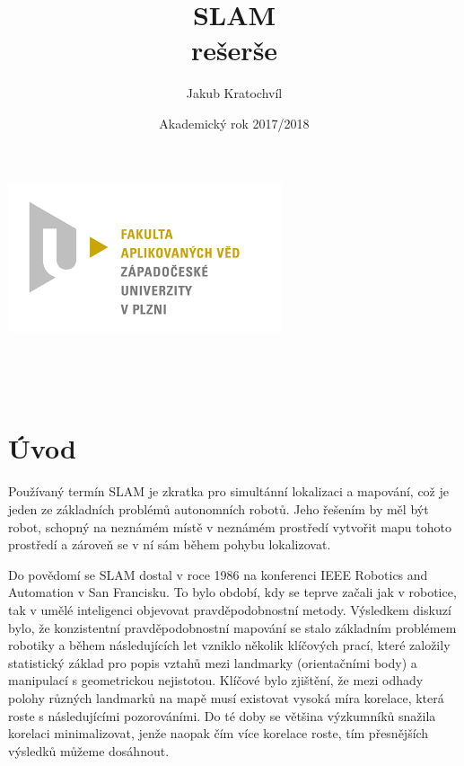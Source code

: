 \documentclass[12pt,a4paper]{article}
\begin{document}
\title{SLAM\\rešerše}
\author{Jakub Kratochvíl}
\date{Akademický rok 2017/2018}
\begin{titlepage}
\begin{center}
\includegraphics[scale=0.5]{logo_zcu}\\
\vspace{5cm}
\begin{Large}
\textbf{\thetitle}\\
\end{Large}
\vspace{3cm}
\theauthor\\
\vspace{5cm}
\thedate
\end{center}
\end{titlepage}
\newpage
		
		
\tableofcontents
\newpage
\fontsize{12pt}{18pt}\selectfont


\section{Úvod}
Používaný termín SLAM je zkratka pro simultánní lokalizaci a mapování, což je jeden ze základních problémů autonomních robotů. Jeho řešením by měl být robot, schopný na neznámém místě v neznámém prostředí vytvořit mapu tohoto prostředí a zároveň se v ní sám během pohybu lokalizovat.

Do povědomí se SLAM dostal v roce 1986 na konferenci IEEE Robotics and Automation v San Francisku. To bylo období, kdy se teprve začali jak v robotice, tak v umělé inteligenci objevovat pravděpodobnostní metody. Výsledkem diskuzí bylo, že konzistentní pravděpodobnostní mapování se stalo základním problémem robotiky a během následujících let vzniklo několik klíčových prací, které založily statistický základ pro popis vztahů mezi landmarky (orientačními body) a manipulací s geometrickou nejistotou. Klíčové bylo zjištění, že mezi odhady polohy různých landmarků na mapě musí existovat vysoká míra korelace, která roste s následujícími pozorováními. Do té doby se většina výzkumníků snažila korelaci minimalizovat, jenže naopak čím více korelace roste, tím přesnějších výsledků můžeme dosáhnout.
\end{document}
